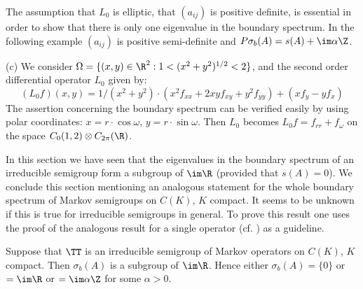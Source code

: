 \begin{examples}
	The assumption that $L_{0}$ is elliptic, \ie that $(a_{ij})$ is positive definite, is essential in order to show that there is only one eigenvalue in the boundary spectrum.
	In the following example $(a_{ij})$ is positive semi-definite and $P\sigma_{b}(A) = s(A) + \im\alpha\Z$.
	
	(c) We consider $\Omega = \{(x,y) \in \R^{2} : 1 < (x^{2} + y^{2})^{1/2} < 2\}$, and the second order differential operator $L_{0}$ given by:
	\[
	(L_{0}f)(x,y) = 1/(x^{2} + y^{2})\cdot(x^{2}f_{xx} + 2xyf_{xy} + y^{2}f_{yy}) + (xf_{y} - yf_{x})
	\]
	The assertion concerning the boundary spectrum can be verified easily by using polar coordinates: $x = r\cdot\cos\omega$, $y = r\cdot\sin\omega$.
	Then $L_{0}$ becomes $L_{0}f = f_{rr} + f_{\omega}$ on the space $C_{0}(1,2) \otimes C_{2\pi}(\R)$.
\end{examples}
In this section we have seen that the eigenvalues in the boundary spectrum of an irreducible semigroup form a subgroup of $\im \R$ (provided that $s(A) = 0$).
We conclude this section mentioning an analogous statement for the whole boundary spectrum of Markov semigroups on $C(K)$, $K$ compact.
It seems to be unknown if this is true for irreducible semigroups in general.
To prove this result one uses the proof of the analogous result for a single operator (cf. \citet[Thm.7]{schaefer:1968}) as a guideline.
\begin{theorem}\label{thm:b3-3.11}
	Suppose that $\TT$ is an irreducible semigroup of Markov operators on $C(K)$, $K$ compact.
	Then $\sigma_{b}(A)$ is a subgroup of $\im \R$.
	Hence either $\sigma_{b}(A) = \{0\}$ or $= \im\R$ or $= \im\alpha\Z$ for some $\alpha > 0$.
\end{theorem}
%
